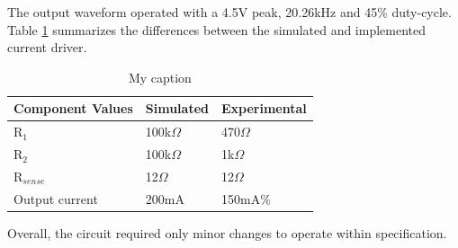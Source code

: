 The output waveform operated with a 4.5V peak, 20.26kHz and 45\% duty-cycle. Table \ref{tab:currentdriver} summarizes the differences between the simulated and implemented current driver.  


\begin{table}[H]
	\centering
	\caption{My caption}
	\label{tab:currentdriver}
	\begin{tabular}{|l|l|l|}
		\hline
		Component Values & Simulated  & Experimental \\ \hline
		R$_1$            & 100k$\Omega$      & 470$\Omega$        \\ \hline
		R$_2$            & 100k$\Omega$      & 1k$\Omega$      \\ \hline
		R$_{sense}$      & 12$\Omega$ & 12$\Omega$   \\ \hline
		Output current   & 200mA       & 150mA\%       \\ \hline
	\end{tabular}
\end{table}

Overall, the circuit required only minor changes to operate within specification.


